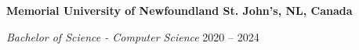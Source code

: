 \textbf{Memorial University of Newfoundland \hfill St. John's, NL, Canada} \par
\textit{Bachelor of Science - Computer Science} \hfill 2020 -- 2024\par